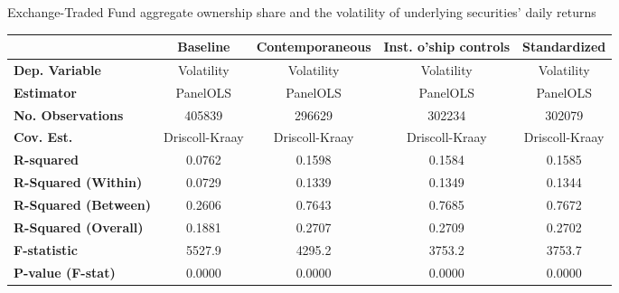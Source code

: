 {\small
  \begin{center}
\caption{Exchange-Traded Fund aggregate ownership share and the volatility of underlying securities' daily returns}
  \label{tab:Volatility:Comp}
  \begin{tabular}{lcccc}
\toprule
                                                            & \textbf{Baseline}  & \textbf{Contemporaneous} & \textbf{Inst. o'ship controls} & \textbf{Standardized}  \\
\midrule
\textbf{Dep. Variable}                                      &     Volatility     &        Volatility        &           Volatility           &       Volatility       \\
\textbf{Estimator}                                          &      PanelOLS      &         PanelOLS         &            PanelOLS            &        PanelOLS        \\
\textbf{No. Observations}                                   &       405839       &          296629          &             302234             &         302079         \\
\textbf{Cov. Est.}                                          &   Driscoll-Kraay   &      Driscoll-Kraay      &         Driscoll-Kraay         &     Driscoll-Kraay     \\
\textbf{R-squared}                                          &       0.0762       &          0.1598          &             0.1584             &         0.1585         \\
\textbf{R-Squared (Within)}                                 &       0.0729       &          0.1339          &             0.1349             &         0.1344         \\
\textbf{R-Squared (Between)}                                &       0.2606       &          0.7643          &             0.7685             &         0.7672         \\
\textbf{R-Squared (Overall)}                                &       0.1881       &          0.2707          &             0.2709             &         0.2702         \\
\textbf{F-statistic}                                        &       5527.9       &          4295.2          &             3753.2             &         3753.7         \\
\textbf{P-value (F-stat)}                                   &       0.0000       &          0.0000          &             0.0000             &         0.0000         \\
\midrule

\end{tabular}
\end{center}}
